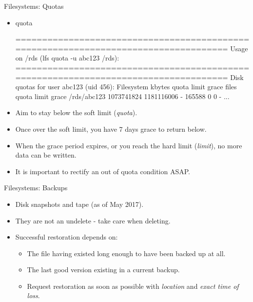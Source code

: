 \begin{frame}[fragile]{Filesystems: Quotas}
\begin{itemize}
\item{quota}
\begin{semiverbatim}
\tiny
====================================================================================
Usage on /rds (lfs quota -u abc123 /rds):
====================================================================================
Disk quotas for user abc123 (uid 456):
      Filesystem  kbytes   quota   limit   grace   files   quota   limit   grace
 /rds/abc123   1073741824 1181116006   -   165588       0       0       -
...
\end{semiverbatim}
\item<1-|handout:1->{\alert{Aim to stay below the soft limit (\emph{quota}).}}
\item<2-|handout:1->{\alert{Once over the soft limit, you have 7 days grace to return below.}}
\item<3-|handout:2>{\alert{When the grace period expires, or you reach the hard limit (\emph{limit}), no more data can be written.}}
\item<4-|handout:2>{\alert{It is important to rectify an out of quota condition ASAP.}}
\end{itemize}
\end{frame}

\begin{frame}{Filesystems: Backups}
\begin{itemize}
\item<1->{Disk snapshots and tape (as of May 2017).}
\item<2->{{\color{red}They are not an undelete - take care when deleting.}}
\item<3->{Successful restoration depends on:}
\begin{itemize}
\item{The file having existed long enough to have been backed up at all.}
\item{The last good version existing in a current backup.}
\item<4->{\color{red}Request restoration as soon as possible with \emph{location} and \emph{exact time of loss}.}
\medskip
{}
\end{itemize}
\end{itemize}
\end{frame}

